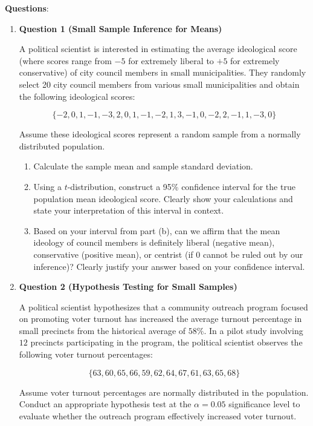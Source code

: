 \documentclass{article}
\begin{document}
\textbf{Questions}:
\begin{enumerate}
    \item \textbf{Question 1 (Small Sample Inference for Means)}

A political scientist is interested in estimating the average ideological score (where scores range from $-5$ for extremely liberal to $+5$ for extremely conservative) of city council members in small municipalities. They randomly select 20 city council members from various small municipalities and obtain the following ideological scores:

\[
\{-2, 0, 1, -1, -3, 2, 0, 1, -1, -2, 1, 3, -1, 0, -2, 2, -1, 1, -3, 0\}
\]

Assume these ideological scores represent a random sample from a normally distributed population.

\begin{enumerate}[label=(\alph*)]

\item Calculate the sample mean and sample standard deviation.

\item Using a $t$-distribution, construct a 95\% confidence interval for the true population mean ideological score. Clearly show your calculations and state your interpretation of this interval in context.

\item Based on your interval from part (b), can we affirm that the mean ideology of council members is definitely liberal (negative mean), conservative (positive mean), or centrist (if $0$ cannot be ruled out by our inference)? Clearly justify your answer based on your confidence interval.

\end{enumerate}

    \item \textbf{Question 2 (Hypothesis Testing for Small Samples)}

A political scientist hypothesizes that a community outreach program focused on promoting voter turnout has increased the average turnout percentage in small precincts from the historical average of $58\%$. In a pilot study involving $12$ precincts participating in the program, the political scientist observes the following voter turnout percentages:

\[
\{63, 60, 65, 66, 59, 62, 64, 67, 61, 63, 65, 68\}
\]

Assume voter turnout percentages are normally distributed in the population. Conduct an appropriate hypothesis test at the $\alpha = 0.05$ significance level to evaluate whether the outreach program effectively increased voter turnout.


\end{enumerate}
\end{document}
